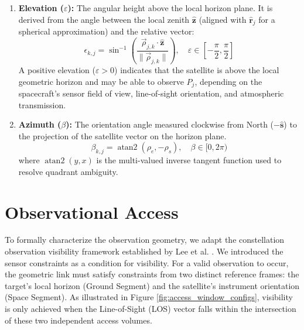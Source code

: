 \begin{table}[ht]
{\begin{itemize}
\begin{enumerate}
    \item \textbf{Elevation ($\varepsilon$):} The angular height above the local horizon plane. It is derived from the angle between the local zenith $\hat{\mathbf{z}}$ (aligned with $\hat{\boldsymbol{r}}_{j}$ for a spherical approximation) and the relative vector:    \begin{equation}
        \epsilon_{k,j} = \sin^{-1}\left( \frac{\vec{\rho}_{j,k} \cdot \hat{\mathbf{z}}}{\| \vec{\rho}_{j,k} \|} \right), \quad \varepsilon \in \left[ -\frac{\pi}{2}, \frac{\pi}{2} \right]
    \end{equation}
    A positive elevation ($\varepsilon > 0$) indicates that the satellite is above the local geometric horizon and may be able to observe $P_j$, depending on the spacecraft's sensor field of view, line-of-sight orientation, and atmospheric transmission. 
    \item \textbf{Azimuth ($\beta$):} The orientation angle measured clockwise from North ($-\hat{\mathbf{s}}$) to the projection of the satellite vector on the horizon plane.
\begin{equation}
        \beta_{k,j} = \operatorname{atan2}(\rho_e, -\rho_s), \quad \beta \in [0, 2\pi)
    \end{equation}
    where $\operatorname{atan2}(y, x)$ is the multi-valued inverse tangent function used to resolve quadrant ambiguity.
\end{enumerate}

\section{Observational Access}
\label{sec:observational_access}
To formally characterize the observation geometry, we adapt the constellation observation visibility framework established by Lee et al. \cite{lee_satellite_2020}. We introduced the sensor constraints as a condition for visibility.
For a valid observation to occur, the geometric link must satisfy constraints from two distinct reference frames: the target's local horizon (Ground Segment) and the satellite's instrument orientation (Space Segment). As illustrated in Figure \ref{fig:access_window_configs}, visibility is only achieved when the Line-of-Sight (LOS) vector falls within the intersection of these two independent access volumes.


\end{itemize}}
\end{table}
